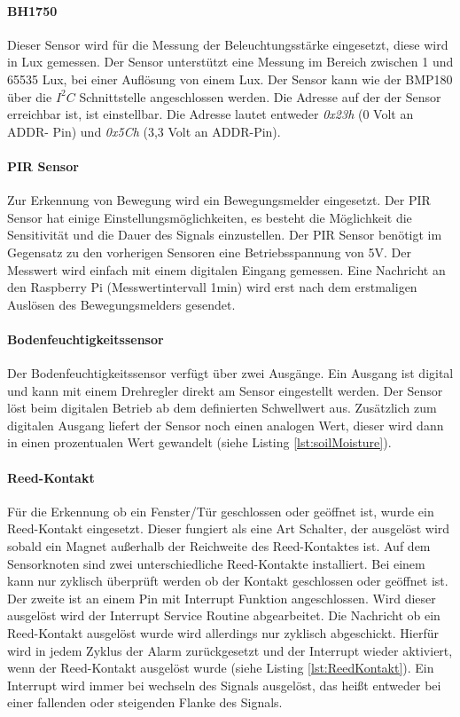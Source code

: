 \paragraph{BH1750} Dieser Sensor wird für die Messung der Beleuchtungsstärke eingesetzt, diese wird in Lux gemessen. Der Sensor unterstützt eine Messung im Bereich zwischen 1 und 65535 Lux, bei einer Auflösung von einem Lux. Der Sensor kann wie der BMP180 über die $I^2C$ Schnittstelle angeschlossen werden. Die Adresse auf der der Sensor erreichbar ist, ist einstellbar. Die Adresse lautet entweder \textit{0x23h} (0 Volt an ADDR- Pin) und \textit{0x5Ch} (3,3 Volt an ADDR-Pin). 
\paragraph{PIR Sensor} Zur Erkennung von Bewegung wird ein Bewegungsmelder eingesetzt. Der PIR Sensor hat einige Einstellungsmöglichkeiten, es besteht die Möglichkeit die Sensitivität und die Dauer des Signals einzustellen. Der PIR Sensor benötigt im Gegensatz zu den vorherigen Sensoren eine Betriebsspannung von 5V. Der Messwert wird einfach mit einem digitalen Eingang gemessen. Eine Nachricht an den Raspberry Pi (Messwertintervall 1min) wird erst nach dem erstmaligen Auslösen des Bewegungsmelders gesendet.
\paragraph{Bodenfeuchtigkeitssensor} Der Bodenfeuchtigkeitssensor verfügt über zwei Ausgänge. Ein Ausgang ist digital und kann mit einem Drehregler direkt am Sensor eingestellt werden. Der Sensor löst beim digitalen Betrieb ab dem definierten Schwellwert aus. Zusätzlich zum digitalen Ausgang liefert der Sensor noch einen analogen Wert, dieser wird dann in einen prozentualen Wert gewandelt (siehe Listing \ref{lst:soilMoisture}). 


\paragraph{Reed-Kontakt} Für die Erkennung ob ein Fenster/Tür geschlossen oder geöffnet ist, wurde ein Reed-Kontakt eingesetzt. Dieser fungiert als eine Art Schalter, der ausgelöst wird sobald ein Magnet außerhalb der Reichweite des Reed-Kontaktes ist. Auf dem Sensorknoten sind zwei unterschiedliche Reed-Kontakte installiert. Bei einem kann nur zyklisch überprüft werden ob der Kontakt geschlossen oder geöffnet ist. Der zweite ist an einem Pin mit Interrupt Funktion angeschlossen. Wird dieser ausgelöst wird der Interrupt Service Routine abgearbeitet. Die Nachricht ob ein Reed-Kontakt ausgelöst wurde wird allerdings nur zyklisch abgeschickt. Hierfür wird in jedem Zyklus der Alarm zurückgesetzt und der Interrupt wieder aktiviert, wenn der Reed-Kontakt ausgelöst wurde (siehe Listing \ref{lst:ReedKontakt}). Ein Interrupt wird immer bei wechseln des Signals ausgelöst, das heißt entweder bei einer fallenden oder steigenden Flanke des Signals.

